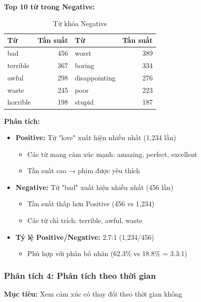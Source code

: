 \textbf{Top 10 từ trong Negative:}
\begin{table}[H]
\centering
\caption{Từ khóa Negative}
\begin{tabular}{|l|r|l|r|}
\hline
\textbf{Từ} & \textbf{Tần suất} & \textbf{Từ} & \textbf{Tần suất} \\
\hline
bad & 456 & worst & 389 \\
\hline
terrible & 367 & boring & 334 \\
\hline
awful & 298 & disappointing & 276 \\
\hline
waste & 245 & poor & 223 \\
\hline
horrible & 198 & stupid & 187 \\
\hline
\end{tabular}
\end{table}

\textbf{Phân tích:}
\begin{itemize}
    \item \textbf{Positive:} Từ "love" xuất hiện nhiều nhất (1,234 lần)
    \begin{itemize}
        \item Các từ mang cảm xúc mạnh: amazing, perfect, excellent
        \item Tần suất cao → phim được yêu thích
    \end{itemize}
    
    \item \textbf{Negative:} Từ "bad" xuất hiện nhiều nhất (456 lần)
    \begin{itemize}
        \item Tần suất thấp hơn Positive (456 vs 1,234)
        \item Các từ chỉ trích: terrible, awful, waste
    \end{itemize}
    
    \item \textbf{Tỷ lệ Positive/Negative:} 2.7:1 (1,234/456)
    \begin{itemize}
        \item Phù hợp với phân bố nhãn (62.3\% vs 18.8\% = 3.3:1)
    \end{itemize}
\end{itemize}

\subsubsection{Phân tích 4: Phân tích theo thời gian}

\textbf{Mục tiêu:} Xem cảm xúc có thay đổi theo thời gian không

